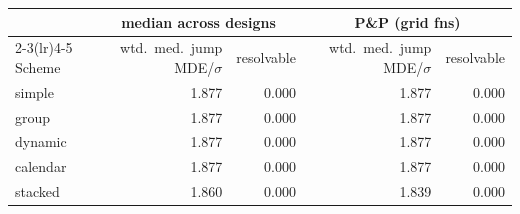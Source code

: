 \begin{tabular}{lrrrr}
\toprule
& \multicolumn{2}{c}{median across designs} & \multicolumn{2}{c}{P\&P (grid fns)} \\
\cmidrule(lr){2-3}\cmidrule(lr){4-5}
Scheme & wtd.\ med.\ jump MDE/$\sigma$ & resolvable & wtd.\ med.\ jump MDE/$\sigma$ & resolvable \\
\midrule
simple & 1.877 & 0.000 & 1.877 & 0.000 \\
group & 1.877 & 0.000 & 1.877 & 0.000 \\
dynamic & 1.877 & 0.000 & 1.877 & 0.000 \\
calendar & 1.877 & 0.000 & 1.877 & 0.000 \\
stacked & 1.860 & 0.000 & 1.839 & 0.000 \\
\bottomrule
\end{tabular}
